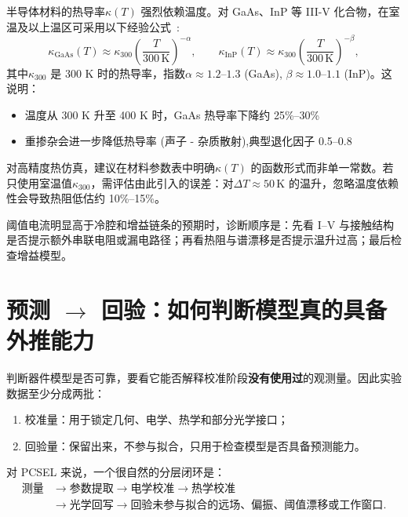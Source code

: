 \begin{MaterialPropertyBox}[热导率的温度依赖性]
半导体材料的热导率$\kappa(T)$ 强烈依赖温度。对 GaAs、InP 等 III-V 化合物，在室温及以上温区可采用以下经验公式~\cite{glassbrenner1964thermal,adachi1985gaas}:
\begin{equation}
\kappa_{\mathrm{GaAs}}(T) \approx \kappa_{300} \left(\frac{T}{300\,\mathrm{K}}\right)^{-\alpha},
\qquad
\kappa_{\mathrm{InP}}(T) \approx \kappa_{300} \left(\frac{T}{300\,\mathrm{K}}\right)^{-\beta},
\label{eq:kappa_temp_dependence}
\end{equation}
其中$\kappa_{300}$ 是 300 K 时的热导率，指数$\alpha \approx 1.2\text{--}1.3$ (GaAs), $\beta \approx 1.0\text{--}1.1$ (InP)。这说明：
\begin{itemize}
  \item 温度从 300 K 升至 400 K 时，GaAs 热导率下降约 25\%--30\%
  \item 重掺杂会进一步降低热导率 (声子 - 杂质散射),典型退化因子 0.5--0.8
\end{itemize}
对高精度热仿真，建议在材料参数表中明确$\kappa(T)$ 的函数形式而非单一常数。若只使用室温值$\kappa_{300}$，需评估由此引入的误差：对$\Delta T \approx 50\,\mathrm{K}$ 的温升，忽略温度依赖性会导致热阻低估约 10\%--15\%。
\end{MaterialPropertyBox}

阈值电流明显高于冷腔和增益链条的预期时，诊断顺序是：先看 I--V 与接触结构是否提示额外串联电阻或漏电路径；再看热阻与谱漂移是否提示温升过高；最后检查增益模型。

\section{预测 \texorpdfstring{$\rightarrow$}{->} 回验：如何判断模型真的具备外推能力}
判断器件模型是否可靠，要看它能否解释校准阶段\textbf{没有使用过}的观测量。因此实验数据至少分成两批：
\begin{enumerate}
  \item 校准量：用于锁定几何、电学、热学和部分光学接口；
  \item 回验量：保留出来，不参与拟合，只用于检查模型是否具备预测能力。
\end{enumerate}
对 PCSEL 来说，一个很自然的分层闭环是：
\begin{equation}
\begin{aligned}
\text{测量}
&\rightarrow
\text{参数提取}
\rightarrow
\text{电学校准}
\rightarrow
\text{热学校准}
\\
&\rightarrow
\text{光学回写}
\rightarrow
\text{回验未参与拟合的远场、偏振、阈值漂移或工作窗口}.
\end{aligned}
\label{eq:validation_loop}
\end{equation}

